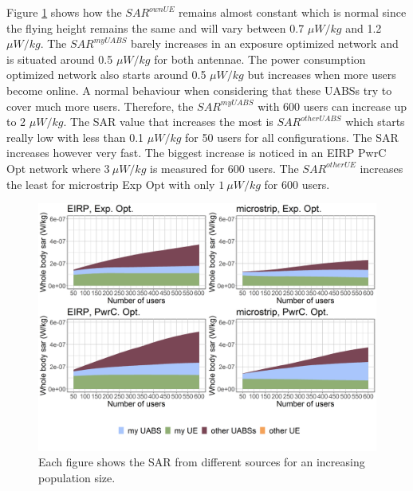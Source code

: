 Figure \ref{fig:s3b_fourSourcesMatrix} shows how the  $SAR^{ownUE}$  
remains almost constant which is normal since the flying height remains the same and will 
vary between  0.7 $\mu W/kg$ and 1.2 $\mu W/kg$.
The $SAR^{myUABS}$ barely increases in an exposure optimized network and is situated around 0.5 $\mu W/kg$ for both antennae.
The power consumption optimized network also starts around 0.5 $\mu W/kg$ but increases when more users become online. 
A normal behaviour when considering that these \gls{UABS}s try to cover much more users. Therefore, the $SAR^{myUABS}$ 
with 600 users can increase up to 2 $\mu W/kg$.
The \gls{SAR} value that increases the most is $SAR^{otherUABS}$ which 
starts really low with less than 0.1 $\mu W/kg$ for 50 users for all configurations. 
The \gls{SAR} increases however very fast. The biggest increase is noticed in an \gls{EIRP} \gls{PwrC Opt} network 
where $3\ \mu W/kg$ is measured for 600 users. The $SAR^{otherUE}$ increases the least for microstrip \gls{Exp Opt} with 
only $1\ \mu W/kg$ for 600 users.
\begin{figure}[h!]
\centering
  \includegraphics[width=\textwidth]{../results/s3/uFourSources.png}
  \caption{Each figure shows the \acs{SAR} from different sources for an increasing population size. 
}
  \label{fig:s3b_fourSourcesMatrix}
\end{figure}

